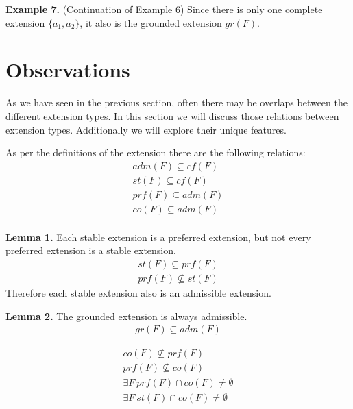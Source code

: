 \documentclass[draft,final]{vutinfth} %
\newcommand{\dl}{\par\bigskip}
\begin{document}
\textbf{Example 7.} (Continuation of Example 6) Since there is only one complete extension $\{a_1,a_2\}$, it also is the grounded extension $gr(F)$.\dl

\chapter{Observations}

As we have seen in the previous section, often there may be overlaps between the different extension types. In this section we will discuss those relations between extension types. Additionally we will explore their unique features.\dl

As per the definitions of the extension there are the following relations:
\begin{align} %
	adm(F)\subseteq cf(F)\\
	st(F)\subseteq cf(F)\\
	prf(F)\subseteq adm(F)\\
	co(F)\subseteq adm(F)\\
\end{align}\dl

\textbf{Lemma 1.} %
Each stable extension is a preferred extension, but not every preferred extension is a stable extension.\\
\begin{align}
	st(F)\subseteq prf(F)\\
	prf(F)\not\subseteq st(F)
\end{align}
Therefore each stable extension also is an admissible extension.\dl

\textbf{Lemma 2.} %
The grounded extension is always admissible. %
\begin{align}
	gr(F)\subseteq adm(F)
\end{align}


\begin{align}
	co(F)\not\subseteq prf(F)\\
	prf(F)\not\subseteq co(F)\\
	\exists F\ prf(F)\cap co(F) \not = \emptyset\\
	\exists F\ st(F)\cap co(F) \not = \emptyset 
\end{align}
\end{document}

